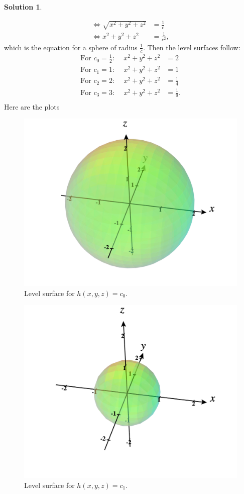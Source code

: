 \documentclass[12pt]{report} %
\theoremstyle{definition}
\newtheorem{solution}{Solution}
\begin{document}
\begin{solution}
\begin{enumerate}[(a)]
\begin{align*}
        \iff \sqrt{x^2+y^2+z^2}&=\frac{1}{c}\\
        \iff x^2+y^2+z^2 &= \frac{1}{c^2},
    \end{align*}
    which is the equation for a sphere of radius $\frac{1}{c}$.  Then the level surfaces follow:
        \begin{align*}
        \textrm{For $c_0=\frac{1}{2}$:~}\quad x^2+y^2+z^2&=2\\
        \textrm{For $c_1=1$:~}\quad x^2+y^2+z^2&=1\\
        \textrm{For $c_2=2$:~}\quad x^2+y^2+z^2&=\frac{1}{4}\\
        \textrm{For $c_3=3$:~}\quad x^2+y^2+z^2&=\frac{1}{9}.\\
    \end{align*}
    Here are the plots
    \begin{figure}[H]
        \centering
        \includegraphics[width=.6\textwidth]{Images/level_surface_c0.png}
        \caption{Level surface for $h(x,y,z)=c_0$.}
    \end{figure}
        \begin{figure}[H]
        \centering
        \includegraphics[width=.6\textwidth]{Images/level_surface_c1.png}
        \caption{Level surface for $h(x,y,z)=c_1$.}
    \end{figure}

\end{enumerate}
\end{solution}
\end{document}
